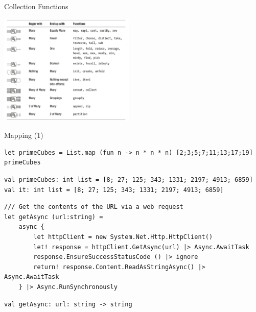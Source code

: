 \documentclass[t]{beamer}
\begin{document}
\begin{frame}[label={sec:orgddd762a}]{Collection Functions}
\begin{center}
\includegraphics[height=200]{../img/CollectionFunctions.png}
\label{fig:collection-functions}
\end{center}
\end{frame}

\begin{frame}[label={sec:org69444ff},fragile]{Mapping (1)}
 \begin{verbatim}
let primeCubes = List.map (fun n -> n * n * n) [2;3;5;7;11;13;17;19]
primeCubes
\end{verbatim}

\begin{verbatim}
val primeCubes: int list = [8; 27; 125; 343; 1331; 2197; 4913; 6859]
val it: int list = [8; 27; 125; 343; 1331; 2197; 4913; 6859]
\end{verbatim}


\begin{verbatim}
/// Get the contents of the URL via a web request
let getAsync (url:string) = 
    async {
        let httpClient = new System.Net.Http.HttpClient()
        let! response = httpClient.GetAsync(url) |> Async.AwaitTask
        response.EnsureSuccessStatusCode () |> ignore
        return! response.Content.ReadAsStringAsync() |> Async.AwaitTask
    } |> Async.RunSynchronously
\end{verbatim}

\begin{verbatim}
val getAsync: url: string -> string
\end{verbatim}
\end{frame}
\end{document}
